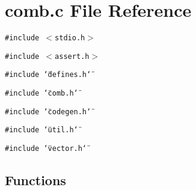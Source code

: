 \section{comb.c File Reference}
\label{comb_8c}
{\tt \#include $<$stdio.h$>$}\par
{\tt \#include $<$assert.h$>$}\par
{\tt \#include \char`\"{}defines.h\char`\"{}}\par
{\tt \#include \char`\"{}comb.h\char`\"{}}\par
{\tt \#include \char`\"{}codegen.h\char`\"{}}\par
{\tt \#include \char`\"{}util.h\char`\"{}}\par
{\tt \#include \char`\"{}vector.h\char`\"{}}\par
\subsection*{Functions}
